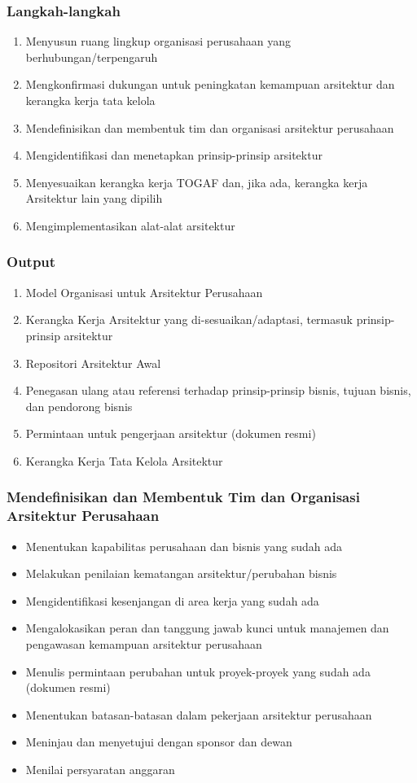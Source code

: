 \documentclass[aspectratio=169]{beamer}
\begin{document}
	\begin{frame}
		\frametitle{Langkah-langkah}
		\begin{enumerate}
			\item Menyusun ruang lingkup organisasi perusahaan yang berhubungan/terpengaruh
			\item Mengkonfirmasi dukungan untuk peningkatan kemampuan arsitektur dan kerangka kerja tata kelola
			\item Mendefinisikan dan membentuk tim dan organisasi arsitektur perusahaan
			\item Mengidentifikasi dan menetapkan prinsip-prinsip arsitektur
			\item Menyesuaikan kerangka kerja TOGAF dan, jika ada, kerangka kerja Arsitektur lain yang dipilih
			\item Mengimplementasikan alat-alat arsitektur
		\end{enumerate}
	\end{frame}
	
	\begin{frame}
		\frametitle{Output}
		\begin{enumerate}
			\item Model Organisasi untuk Arsitektur Perusahaan
			\item Kerangka Kerja Arsitektur yang di-sesuaikan/adaptasi, termasuk prinsip-prinsip arsitektur
			\item Repositori Arsitektur Awal
			\item Penegasan ulang atau referensi terhadap prinsip-prinsip bisnis, tujuan bisnis, dan pendorong bisnis
			\item Permintaan untuk pengerjaan arsitektur (dokumen resmi)
			\item Kerangka Kerja Tata Kelola Arsitektur
		\end{enumerate}
	\end{frame}
	
	\begin{frame}
		\frametitle{Mendefinisikan dan Membentuk Tim dan Organisasi Arsitektur Perusahaan}
		\begin{itemize}
			\item Menentukan kapabilitas perusahaan dan bisnis yang sudah ada
			\item Melakukan penilaian kematangan arsitektur/perubahan bisnis
			\item Mengidentifikasi kesenjangan di area kerja yang sudah ada
			\item Mengalokasikan peran dan tanggung jawab kunci untuk manajemen dan pengawasan kemampuan arsitektur perusahaan
			\item Menulis permintaan perubahan untuk proyek-proyek yang sudah ada (dokumen resmi)
			\item Menentukan batasan-batasan dalam pekerjaan arsitektur perusahaan
			\item Meninjau dan menyetujui dengan sponsor dan dewan
			\item Menilai persyaratan anggaran
		\end{itemize}
	\end{frame}
\end{document}
